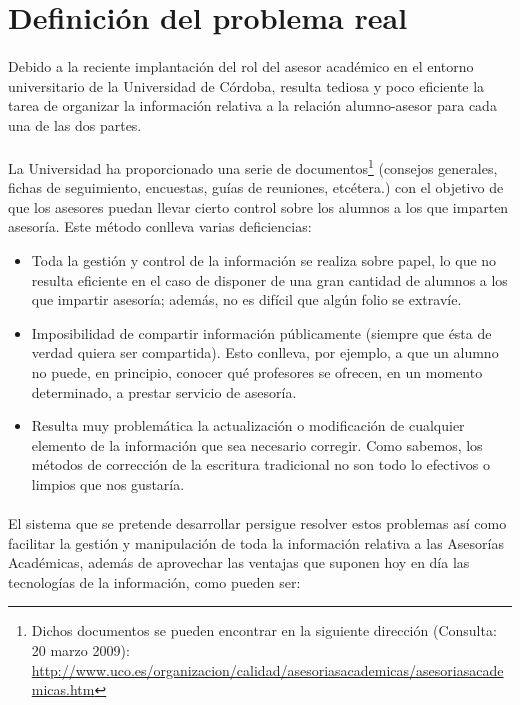 \section{Definición del problema real}

\paragraph{}Debido a la reciente implantación del rol del asesor académico en el
entorno
universitario de la Universidad de Córdoba, resulta tediosa y poco eficiente la
tarea de organizar la información relativa a la relación alumno-asesor para
cada una de las dos partes.

\paragraph{}La Universidad ha proporcionado una serie de
documentos\footnote{Dichos documentos se pueden encontrar en la
siguiente dirección (Consulta: 20 marzo 2009): \url{http://www.uco.es/organizacion/calidad/asesoriasacademicas/asesoriasacademicas.htm}
} (consejos generales, fichas de seguimiento, encuestas, guías de
reuniones, etcétera.) con
el objetivo de que los asesores puedan llevar cierto control sobre los alumnos
a los que imparten asesoría. Este método conlleva varias deficiencias:

\begin{itemize}
 \item Toda la gestión y control de la información se realiza sobre papel, lo
       que no resulta eficiente en el caso de disponer de una gran cantidad de
       alumnos a los que impartir asesoría; además, no es difícil que algún
       folio se extravíe.
 \item Imposibilidad de compartir información públicamente (siempre que ésta
       de verdad quiera ser compartida). Esto conlleva, por ejemplo, a que un
       alumno no puede, en principio, conocer qué profesores se ofrecen, en un
       momento determinado, a prestar servicio de asesoría.
 \item Resulta muy problemática la actualización o modificación de cualquier
       elemento de la información que sea necesario corregir. Como sabemos, los
       métodos de corrección de la escritura tradicional no son todo lo
       efectivos o limpios que nos gustaría.
\end{itemize}

\paragraph{}El sistema que se pretende desarrollar persigue resolver estos
problemas así
como facilitar la gestión y manipulación de toda la información relativa a
las Asesorías Académicas, además de aprovechar las ventajas que suponen hoy en
día las tecnologías de la información, como pueden ser:


